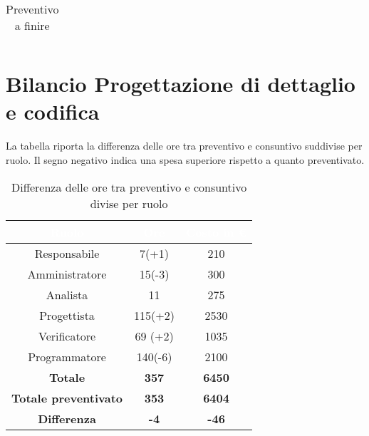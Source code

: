 \begin{flushleft}
\begin{table}[!h]
\begin{center}
\begin{tabular}{ccc}
		\end{tabular}
  
		\caption{Preventivo a finire} 
  
	\end{center}
  
\end{table}
\newpage
\section{Bilancio Progettazione di dettaglio e codifica}\label{BilProgDC}
La tabella riporta la differenza delle ore tra preventivo e consuntivo suddivise per ruolo. Il segno negativo indica una spesa superiore rispetto a quanto preventivato.\\
		\begin{table}[!h]
		\begin{center}
			\begin{tabular}{ccc}
				\rowcolor{coolblack}
				\hline
				\textcolor{white}{Ruolo} & \textcolor{white}{Ore} & \textcolor{white}{Costo in \euro}\\
				\hline
				Responsabile   & 7(+1)	&  	210 	\\ 
				Amministratore & 15(-3)	&  	300 	\\ 
				Analista       & 11 &   275\\ 
				Progettista    & 115(+2)&   2530	\\ 
				Verificatore   & 69	(+2)&  	1035	\\ 
				Programmatore  & 140(-6)&   2100	\\ \hline
				\textbf{Totale}& \textbf{357} & \textbf{6450}	\\ \hline 
				\textbf{Totale preventivato}& \textbf{353} & \textbf{6404}\\ \hline 
				\textbf{Differenza}& \textbf{-4} & \textbf{-46}	\\ \hline  
			\end{tabular}
			
			\caption{Differenza delle ore tra preventivo e consuntivo divise per ruolo} 
		\end{center}
	\end{table}

	
	
	\begin{table}[!h]
		\begin{center}
			\begin{tabularx}{\textwidth}{|c|cccccc|c|}
				

\end{tabularx}
\end{center}
\end{table}
\end{flushleft}

